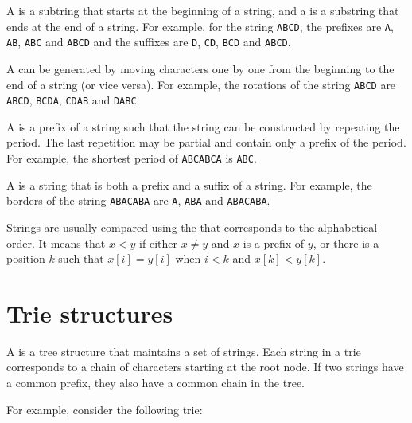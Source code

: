
A  is a subtring that starts at the beginning
of a string,
and a  is a substring that ends at the end
of a string.
For example, for the string \texttt{ABCD},
the prefixes are
\texttt{A}, \texttt{AB}, \texttt{ABC} and \texttt{ABCD}
and the suffixes are
\texttt{D}, \texttt{CD}, \texttt{BCD} and \texttt{ABCD}.


A  can be generated by moving
characters one by one from the beginning
to the end of a string (or vice versa).
For example, the rotations of the string
\texttt{ABCD} are
\texttt{ABCD}, \texttt{BCDA}, \texttt{CDAB} and \texttt{DABC}.


A  is a prefix of a string such that
the string can be constructed by repeating the period.
The last repetition may be partial and contain
only a prefix of the period.
For example, the shortest period of
\texttt{ABCABCA} is \texttt{ABC}.


A  is a string that is both
a prefix and a suffix of a string.
For example, the borders of the string \texttt{ABACABA}
are \texttt{A}, \texttt{ABA} and \texttt{ABACABA}.


Strings are usually compared using the 
that corresponds to the alphabetical order.
It means that $x<y$ if either $x \neq y$ and $x$ is a prefix of $y$,
or there is a position $k$ such that
$x[i]=y[i]$ when $i<k$ and $x[k]<y[k]$.

\section{Trie structures}


A  is a tree structure that
maintains a set of strings.
Each string in a trie corresponds to
a chain of characters starting at
the root node.
If two strings have a common prefix,
they also have a common chain in the tree.

For example, consider the following trie:

